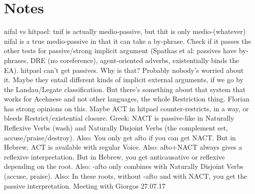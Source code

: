 \section{Notes}
nifal vs hitpael: tnif is actually medio-passive, but thit is only medio-(whatever)
	nifal is a true medio-passive in that it can take a by-phrase. Check if it passes the other tests for passive/strong implicit argument (Spathas et al: passives have by-phrases, DRE (no coreference), agent-oriented adverbs, existentially binds the EA).
	hitpael can't get passives. Why is that? Probably nobody's worried about it.
	Maybe they entail different kinds of implicit external arguments, if we go by the Landau/Legate classification.
	But there's something about that system that works for Acehnese and not other languages, the whole Restriction thing. Florian has strong opinions on this.
	Maybe ACT in hitpael counter-restricts, in a way, or bleeds Restrict/existential closure.
	Greek: NACT is passive-like in Naturally Reflexive Verbs (wash) and Naturally Disjoint Verbs (the complement set, accuse/praise/destroy).
		Also: You only get afto if you can get NACT. But in Hebrew, ACT is available with regular Voice.
		Also: afto+NACT always gives a reflexive interpretation. But in Hebrew, you get anticausative or reflexive depending on the root.
		Also: -afto only combines with Naturally Disjoint Verbs (accuse, praise).
		Also: In these roots, without -afto and with NACT, you get the passive interpretation.
	Meeting with Giorgos 27.07.17
